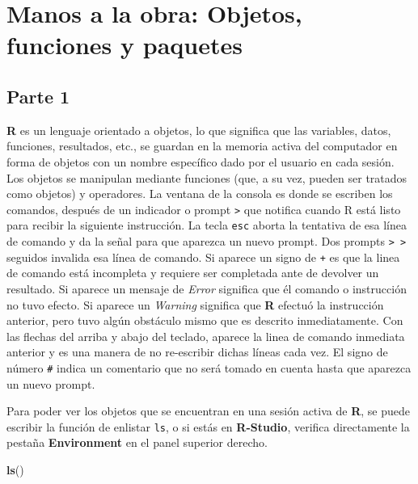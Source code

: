 \documentclass[]{article}
\newenvironment{Shaded}{\begin{snugshade}}{\end{snugshade}}
\newcommand{\KeywordTok}[1]{\textcolor[rgb]{0.13,0.29,0.53}{\textbf{#1}}}
\newcommand{\NormalTok}[1]{#1}
\begin{document}
\hypertarget{manos-a-la-obra-objetos-funciones-y-paquetes}{%
\section{Manos a la obra: Objetos, funciones y
paquetes}\label{manos-a-la-obra-objetos-funciones-y-paquetes}}

\hypertarget{parte-1}{%
\subsection{Parte 1}\label{parte-1}}

\textbf{R} es un lenguaje orientado a objetos, lo que significa que las
variables, datos, funciones, resultados, etc., se guardan en la memoria
activa del computador en forma de objetos con un nombre específico dado
por el usuario en cada sesión. Los objetos se manipulan mediante
funciones (que, a su vez, pueden ser tratados como objetos) y
operadores. La ventana de la consola es donde se escriben los comandos,
después de un indicador o prompt \texttt{\textgreater{}} que notifica
cuando R está listo para recibir la siguiente instrucción. La tecla
\texttt{esc} aborta la tentativa de esa línea de comando y da la señal
para que aparezca un nuevo prompt. Dos prompts
\texttt{\textgreater{}\ \textgreater{}} seguidos invalida esa línea de
comando. Si aparece un signo de \texttt{+} es que la linea de comando
está incompleta y requiere ser completada ante de devolver un resultado.
Si aparece un mensaje de \emph{Error} significa que él comando o
instrucción no tuvo efecto. Si aparece un \emph{Warning} significa que
\textbf{R} efectuó la instrucción anterior, pero tuvo algún obstáculo
mismo que es descrito inmediatamente. Con las flechas del arriba y abajo
del teclado, aparece la linea de comando inmediata anterior y es una
manera de no re-escribir dichas líneas cada vez. El signo de número
\texttt{\#} indica un comentario que no será tomado en cuenta hasta que
aparezca un nuevo prompt.

Para poder ver los objetos que se encuentran en una sesión activa de
\textbf{R}, se puede escribir la función de enlistar \texttt{ls}, o si
estás en \textbf{R-Studio}, verifica directamente la pestaña
\textbf{Environment} en el panel superior derecho.

\begin{Shaded}
\begin{Highlighting}[]
\KeywordTok{ls}\NormalTok{()}
\end{Highlighting}
\end{Shaded}
\end{document}
